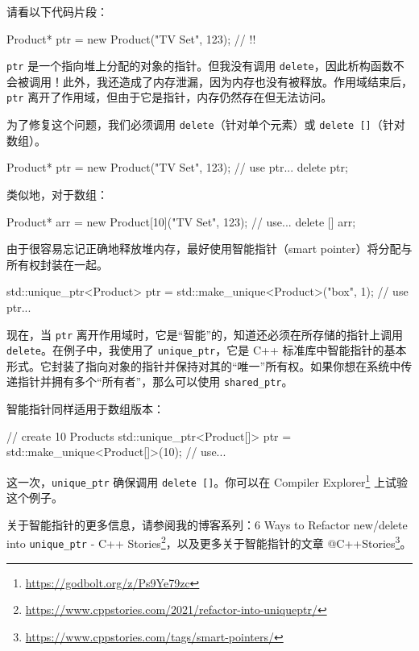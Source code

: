 请看以下代码片段：

\begin{codebox}[cpp]
{
Product* ptr = new Product("TV Set", 123);
}
// !!
\end{codebox}

\texttt{ptr} 是一个指向堆上分配的对象的指针。但我没有调用 \texttt{delete}，因此析构函数不会被调用！此外，我还造成了内存泄漏，因为内存也没有被释放。作用域结束后，\texttt{ptr} 离开了作用域，但由于它是指针，内存仍然存在但无法访问。

为了修复这个问题，我们必须调用 \texttt{delete}（针对单个元素）或 \texttt{delete []}（针对数组）。


\begin{codebox}[cpp]
{
Product* ptr = new Product("TV Set", 123);
// use ptr...
delete ptr;
}
\end{codebox}

类似地，对于数组：

\begin{codebox}[cpp]
{
Product* arr = new Product[10]("TV Set", 123);
// use...
delete [] arr;
}
\end{codebox}

由于很容易忘记正确地释放堆内存，最好使用智能指针（smart pointer）将分配与所有权封装在一起。

\begin{codebox}[cpp]
{
std::unique_ptr<Product> ptr = std::make_unique<Product>("box", 1);
// use ptr...
}
\end{codebox}

现在，当 \texttt{ptr} 离开作用域时，它是“智能”的，知道还必须在所存储的指针上调用 \texttt{delete}。在例子中，我使用了 \texttt{unique\_ptr}，它是 C++ 标准库中智能指针的基本形式。它封装了指向对象的指针并保持对其的“唯一”所有权。如果你想在系统中传递指针并拥有多个“所有者”，那么可以使用 \texttt{shared\_ptr}。

智能指针同样适用于数组版本：

\begin{codebox}[cpp]
{
// create 10 Products
std::unique_ptr<Product[]> ptr = std::make_unique<Product[]>(10);
// use...
}
\end{codebox}

这一次，\texttt{unique\_ptr} 确保调用 \texttt{delete []}。你可以在 Compiler Explorer\footnote{\url{https://godbolt.org/z/Ps9Ye79zc}} 上试验这个例子。

关于智能指针的更多信息，请参阅我的博客系列：6 Ways to Refactor new/delete into \texttt{unique\_ptr} - C++ Stories\footnote{\url{https://www.cppstories.com/2021/refactor-into-uniqueptr/}}，以及更多关于智能指针的文章 @C++Stories\footnote{\url{https://www.cppstories.com/tags/smart-pointers/}}。

